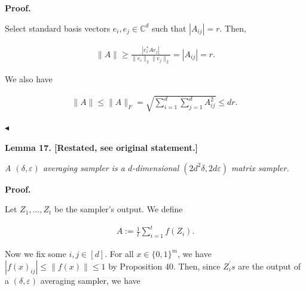 


\par\medskip\noindent\textbf{Proof.}\par




Select standard basis vectors $e_{i},e_{j}\in\mathbb{C}^{d}$ such that $|A_{ij}|=r$. Then,\par


\[\begin{gathered}
\|A\|\geq\frac{|e_{i}^{*}Ae_{j}|}{\|e_{i}\|_{2}\|e_{j}\|_{2}}=|A_{ij}|=r.
\end{gathered}\]


We also have\par


\[\begin{gathered}
\|A\|\leq\|A\|_{F}=\sqrt{\sum_{i=1}^{d}\sum_{j=1}^{d}A_{ij}^{2}}\leq dr.\
\end{gathered}\]


$\blacktriangleleft$\par






\par\medskip\noindent\textbf{
\textbf{Lemma 17}\textbf{.}
[Restated, see original statement.]}\par



\emph{A $(\delta,\varepsilon)$ averaging sampler is a $d$-dimensional $(2d^{2}\delta,2d\varepsilon)$ matrix sampler.}\par








\par\medskip\noindent\textbf{Proof.}\par




Let $Z_{1},\dots,Z_{t}$ be the sampler’s output. We define\par


\[\begin{gathered}
A:=\frac{1}{t}\sum_{i=1}^{t}f(Z_{i}).
\end{gathered}\]


Now we fix some $i,j\in[d]$. For all $x\in\{0,1\}^{m}$, we have $|f(x)_{ij}|\leq\left\lVert f(x)\right\rVert\leq 1$ by Proposition 40. Then, since $Z_{i}^{\prime}s$ are the output of a $(\delta,\varepsilon)$ averaging sampler, we have\par


